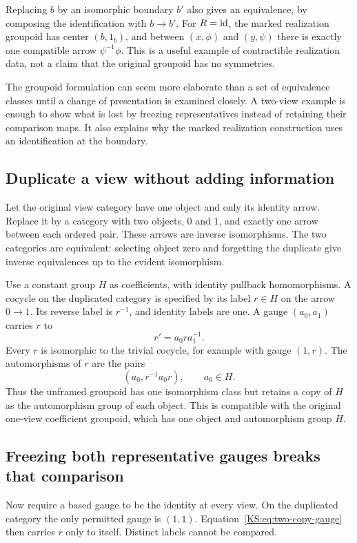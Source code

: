 Replacing \(b\) by an isomorphic boundary \(b'\) also gives an equivalence, by composing the identification with \(b\to b'\). For \(R=\operatorname{id}\), the marked realization groupoid has center \((b,1_b)\), and between \((x,\phi)\) and \((y,\psi)\) there is exactly one compatible arrow \(\psi^{-1}\phi\). This is a useful example of contractible realization data, not a claim that the original groupoid has no symmetries.




\label{KS:sec:boundary-lab}
The groupoid formulation can seem more elaborate than a set of equivalence classes until a change of presentation is examined closely. A two-view example is enough to show what is lost by freezing representatives instead of retaining their comparison maps. It also explains why the marked realization construction uses an identification at the boundary.

\subsection{Duplicate a view without adding information}
Let the original view category have one object and only its identity arrow. Replace it by a category with two objects, \(0\) and \(1\), and exactly one arrow between each ordered pair. These arrows are inverse isomorphisms. The two categories are equivalent: selecting object zero and forgetting the duplicate give inverse equivalences up to the evident isomorphism.

Use a constant group \(H\) as coefficients, with identity pullback homomorphisms. A cocycle on the duplicated category is specified by its label \(r\in H\) on the arrow \(0\to1\). Its reverse label is \(r^{-1}\), and identity labels are one. A gauge \((a_0,a_1)\) carries \(r\) to
\begin{equation}\label{KS:eq:two-copy-gauge}
 r'=a_0ra_1^{-1}.
\end{equation}
Every \(r\) is isomorphic to the trivial cocycle, for example with gauge \((1,r)\). The automorphisms of \(r\) are the pairs
\[
 (a_0,r^{-1}a_0r),\qquad a_0\in H.
\]
Thus the unframed groupoid has one isomorphism class but retains a copy of \(H\) as the automorphism group of each object. This is compatible with the original one-view coefficient groupoid, which has one object and automorphism group \(H\).

\subsection{Freezing both representative gauges breaks that comparison}
Now require a based gauge to be the identity at every view. On the duplicated category the only permitted gauge is \((1,1)\). Equation~\eqref{KS:eq:two-copy-gauge} then carries \(r\) only to itself. Distinct labels cannot be compared.

